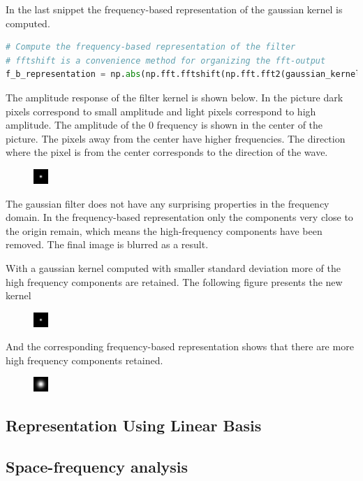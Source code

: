 \documentclass[]{article}
\begin{document}
In the last snippet the frequency-based representation of the gaussian kernel
is computed.
\begin{lstlisting}[language=Python]
# Compute the frequency-based representation of the filter
# fftshift is a convenience method for organizing the fft-output
f_b_representation = np.abs(np.fft.fftshift(np.fft.fft2(gaussian_kernel)))
\end{lstlisting}
The amplitude response of the filter kernel is shown below. In the picture dark
pixels correspond to small amplitude and light pixels correspond to high
amplitude. The amplitude of the 0 frequency is shown in the center of the
picture. The pixels away from the center have higher frequencies. The direction
where the pixel is from the center corresponds to the direction of the wave.
\begin{figure}
    \includegraphics{freq.png}
\end{figure}
The gaussian filter does not have any surprising properties in the frequency
domain. In the frequency-based representation only the components very close to
the origin remain, which means the high-frequency components have been removed.
The final image is blurred as a result.

With a gaussian kernel computed with smaller standard deviation more of the
high frequency components are retained. The following figure presents the 
new kernel
\begin{figure}
    \includegraphics{kernel2.png}
\end{figure}
And the corresponding frequency-based representation shows that there are more
high frequency components retained.
\begin{figure}
    \includegraphics{freq2.png}
\end{figure}


\subsection{Representation Using Linear Basis}
\label{representation-using-linear-basis}
\subsection{Space-frequency analysis}
\label{space-frequency-analysis}
\end{document}
